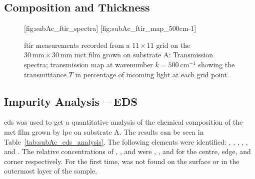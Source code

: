 \subsection{Composition and Thickness}


\begin{figure}[htbp]
    \centering
    [fig:subAc_ftir_spectra]
    \hfill
    [fig:subAc_ftir_map_500cm-1]
    \caption[\Ac{ftir} measurements of the \ac{mct} film grown on substrate A.]{\Ac{ftir} measurements recorded from a $11\times11$ grid on the $\SI{30}{\milli\metre}\times\SI{30}{\milli\metre}$ \ac{mct} film grown on substrate A:  Transmission spectra;  transmission map at wavenumber $k=\SI{500}{\centi\metre^{-1}}$ showing the transmittance $T$ in percentage of incoming light at each grid point.}
\end{figure}

\subsection{Impurity Analysis -- EDS}

\Ac{eds} was used to get a quantitative analysis of the chemical composition of the \ac{mct} film grown by \ac{lpe} on substrate A. The results can be seen in Table~\ref{tab:subAc_eds_analysis}. The following elements were identified: , , , , , and . The relative concentrations of , , and  were , , and  for the centre, edge, and corner respectively. For the first time,  was not found on the surface or in the outermost layer of the sample.

